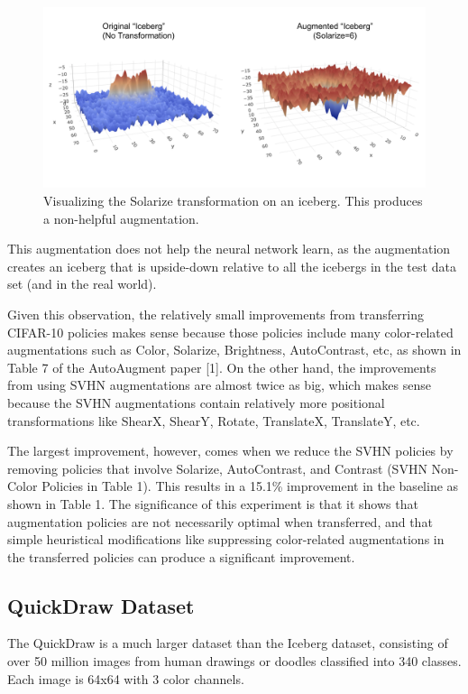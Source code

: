 \documentclass[10pt,twocolumn,letterpaper]{article}
\begin{document}
\begin{figure}[bhp]
\includegraphics[width=\columnwidth]{iceberg_solarize.png}
\caption{Visualizing the Solarize transformation on an iceberg. This produces a non-helpful augmentation.}
\end{figure}

This augmentation does not help the neural network learn, as the augmentation creates an iceberg that is upside-down relative to all the icebergs in the test data set (and in the real world).

Given this observation, the relatively small improvements from transferring CIFAR-10 policies makes sense because those policies include many color-related augmentations such as Color, Solarize, Brightness, AutoContrast, etc, as shown in Table 7 of the AutoAugment paper [1].  On the other hand, the improvements from using SVHN augmentations are almost twice as big, which makes sense because the SVHN augmentations contain relatively more positional transformations like ShearX, ShearY, Rotate, TranslateX, TranslateY, etc.

The largest improvement, however, comes when we reduce the SVHN policies by removing policies that involve Solarize, AutoContrast, and Contrast (SVHN Non-Color Policies in Table 1).  This results in a 15.1\% improvement in the baseline as shown in Table 1.  The significance of this experiment is that it shows that augmentation policies are not necessarily optimal when transferred, and that simple heuristical modifications like suppressing color-related augmentations in the transferred policies can produce a significant improvement.


\subsection{QuickDraw Dataset}

The QuickDraw is a much larger dataset than the Iceberg dataset, consisting of over 50 million images from human drawings or doodles classified into 340 classes.  Each image is 64x64 with 3 color channels.  
\end{document}
